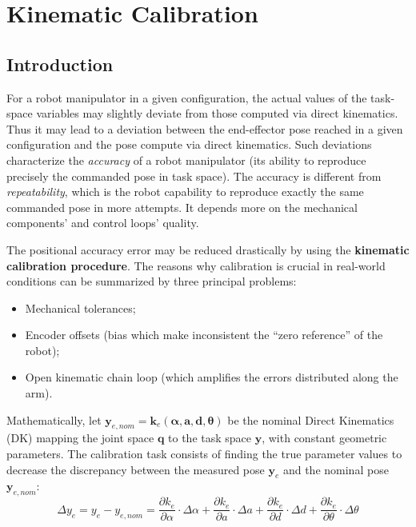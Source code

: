 
\section[Lecture 1 -- {\it Kinematic Calibration}]{Kinematic Calibration}

\subsection{Introduction}

For a robot manipulator in a given configuration, the actual values of the task-space variables may slightly
deviate from those computed via direct kinematics. Thus it may lead to a deviation between the end-effector pose
reached in a given configuration and the pose compute via direct kinematics. Such deviations characterize the
\textit{accuracy} of a robot manipulator (its ability to reproduce precisely the commanded pose in task space).
The accuracy is different from \textit{repeatability}, which is the robot capability to reproduce exactly the 
same commanded pose in more attempts. It depends more on the mechanical components' and control loops' quality.

The positional accuracy error may be reduced drastically by using the \textbf{kinematic calibration procedure}.
The reasons why calibration is crucial in real-world conditions can be summarized by three principal problems:

\begin{itemize}[noitemsep]
  \item Mechanical tolerances;
  \item Encoder offsets (bias which make inconsistent the ``zero reference'' of the robot);
  \item Open kinematic chain loop (which amplifies the errors distributed along the arm).
\end{itemize}

Mathematically, let $\mathbf{y}_{e, nom} = \mathbf{k}_{e}(\boldsymbol{\alpha}, \mathbf{a}, \mathbf{d}, \boldsymbol{\theta})$
be the nominal Direct Kinematics (DK) mapping the joint space $\mathbf{q}$ to the task space $\mathbf{y}$, with constant geometric parameters. The calibration task consists of finding the true parameter values to decrease the discrepancy between the measured pose $\mathbf{y}_{e}$ and the nominal pose $\mathbf{y}_{e, nom}$:
$$
\Delta y_e = y_e - y_{e,nom} = \frac{\partial k_e}{\partial \alpha} \cdot \Delta \alpha + \frac{\partial k_e}{\partial a} \cdot \Delta a + \frac{\partial k_e}{\partial d} \cdot \Delta d + \frac{\partial k_e}{\partial \theta} \cdot \Delta \theta
$$

